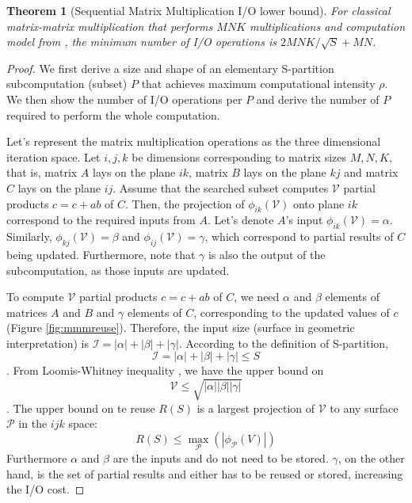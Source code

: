 \documentclass[sigplan,review,anonymous]{acmart}\settopmatter{printfolios=true,printccs=false,printacmref=false}
\newtheorem{thm}{Theorem}
\begin{document}
\begin{thm}[Sequential Matrix Multiplication I/O lower bound]
	For classical matrix-matrix multiplication that performs $MNK$ 
	multiplications and computation model from \cite{redblue}, the minimum 
	number of I/O operations is $2MNK/\sqrt{S} + 
	MN$.
	\label{thm:seqlowbounds}
\end{thm}

\begin{proof}
We first derive a size and shape of an elementary S-partition subcomputation 
(subset) $P$ that 
achieves 
maximum computational intensity $\rho$. We then show the 
number of I/O operations per $P$ and derive the number of $P$ required to 
perform the whole computation.

Let's represent the matrix multiplication operations as the three dimensional 
iteration space. Let $i,j,k$ be dimensions corresponding to matrix sizes 
$M,N,K$, that is, matrix $A$ lays on the plane $ik$, matrix $B$ lays on the 
plane $kj$ and matrix $C$ lays on the plane $ij$.
Assume that the searched subset computes $\mathcal{V}$ partial products $c = c 
+ ab$ of $C$. Then, the projection of $\phi_{ik}(\mathcal{V})$ onto plane $ik$ 
correspond to the required inputs from $A$. Let's denote $A$'s input 
$\phi_{ik}(\mathcal{V}) = \alpha$. Similarly, $\phi_{kj}(\mathcal{V}) = 
\beta$ and $\phi_{ij}(\mathcal{V}) = \gamma$, which correspond to partial 
results of $C$ being updated. Furthermore, note that $\gamma$ is also the 
output of the subcomputation, as those inputs are updated.

To compute $\mathcal{V}$ partial products $c = c + ab$ of $C$, we need 
$\alpha$ 
and $\beta$ elements of matrices $A$ and $B$ and $\gamma$ elements of 
$C$, corresponding to the updated values of $c$ (Figure \ref{fig:mmmreuse}). 
Therefore, the input size (surface in geometric interpretation) is $\mathcal{I} 
= |\alpha| + |\beta| + |\gamma|$. According to the definition of S-partition, 
$$\mathcal{I} = |\alpha| + |\beta| + |\gamma|\le S$$.
From Loomis-Whitney inequality \cite{loomisWhitney}, we have the upper bound on 
$$\mathcal{V} \le \sqrt{|\alpha| |\beta| |\gamma|}$$. 
The upper bound on te reuse 
$R(S)$ is a largest projection of $\mathcal{V}$ to any surface $\mathcal{P}$ in 
the $ijk$ space:
$$R(S) \le \max_\mathcal{P}(|\phi_\mathcal{P}(V)|)$$
Furthermore $\alpha$ and $\beta$ are the inputs and do not need to be stored. 
$\gamma$, on the other hand, is the set of partial results and either has to be 
reused or stored, increasing the I/O cost. 


\end{proof}
\end{document}
